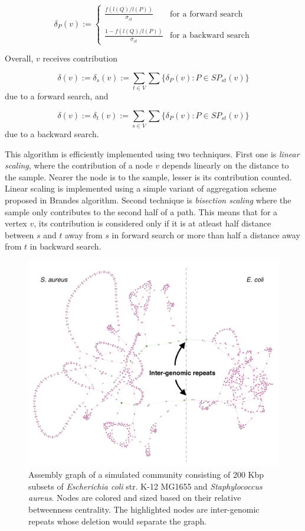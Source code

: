 \documentclass[runningheads,a4paper]{llncs}
\begin{document}
\begin{equation*}
	\delta_{P}(v) := \begin{cases}
					\frac{f(l(Q)/l(P))}{\sigma_{st}} & \text{for a forward search} \\\\
					\frac{1 - f(l(Q)/l(P))}{\sigma_{st}} & \text{for a backward search} 
					\end{cases}
\end{equation*}

Overall, $v$ receives contribution 

$$\delta(v) := \delta_{s}(v) := \sum_{t \in V}\sum \{\delta_{P}(v):  P \in SP_{st}(v)\}$$
due to a forward search, and 

$$\delta(v) := \delta_{t}(v) := \sum_{s \in V}\sum \{\delta_{P}(v):  P \in SP_{st}(v)\}$$
due to a backward search. 

This algorithm is efficiently implemented using two techniques. First one is \textit{linear scaling}, where the contribution of a node $v$ depends linearly on the distance to the sample. Nearer the node is to the sample, lesser is its contribution counted. Linear scaling is implemented using a simple variant of aggregation scheme proposed in Brandes algorithm. Second technique is \textit{bisection scaling} where the sample only contributes to the second half of a path. This means that for a vertex $v$, its contribution is considered only if it is at atleast half distance between $s$ and $t$ away from $s$ in forward search or more than half a distance away from $t$ in backward search. 



\begin{figure}[htbp]
\centering
\includegraphics[width=\textwidth]{es_mix_200kb_k21.png}
\caption{Assembly graph of a simulated community consisting of 200 Kbp subsets of \textit{Escherichia coli} str. K-12 MG1655 and \textit{Staphylococcus aureus}.  Nodes are colored and sized based on their relative betweenness centrality. The highlighted nodes are inter-genomic repeats whose deletion would separate the graph.}
\label{fig:sampled_nodes}
\end{figure}
\end{document}
